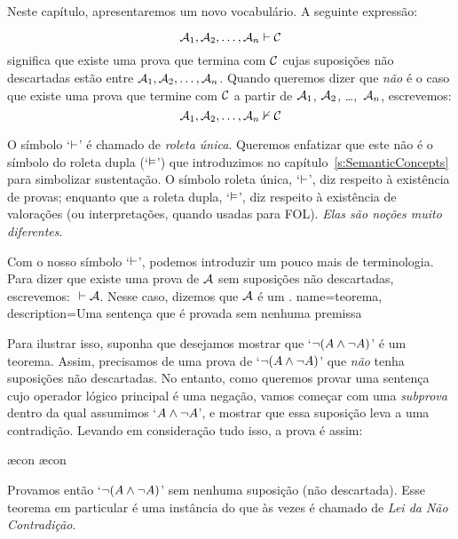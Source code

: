  Neste cap\'itulo, apresentaremos um novo vocabul\'ario. A seguinte express\~ao:
 
$$\mathcal{A}_1, \mathcal{A}_2, \ldots, \mathcal{A}_n \vdash \mathcal{C}$$
significa que existe uma prova que termina com $\mathcal{C}$  cujas suposi\c c\~oes n\~ao descartadas est\~ao entre $\mathcal{A}_1, \mathcal{A}_2, \ldots, \mathcal{A}_n$. Quando queremos dizer que  \emph{n\~ao} \'e o caso que existe uma prova que termine com $\mathcal{C}$ a partir de $\mathcal{A}_1$, $\mathcal{A}_2$, \dots,~$\mathcal{A}_n$, escrevemos:  $$\mathcal{A}_1, \mathcal{A}_2, \ldots, \mathcal{A}_n \nvdash \mathcal{C}$$  

O s\'imbolo `$\vdash$'  \'e chamado de  \emph{roleta \'unica}. Queremos enfatizar que este n\~ao \'e o s\'imbolo do roleta dupla (`$\vDash$') que introduzimos no cap\'itulo~\ref{s:SemanticConcepts}  para simbolizar sustenta\c c\~ao. O s\'imbolo roleta \'unica, `$\vdash$', diz respeito \`a exist\^encia de provas; enquanto que a roleta dupla, `$\vDash$', diz respeito \`a exist\^encia de valora\c c\~oes (ou interpreta\c c\~oes, quando usadas para FOL). \emph{Elas s\~ao no\c c\~oes muito diferentes}.

Com o nosso s\'imbolo  `$\vdash$',  podemos introduzir um pouco mais de terminologia. Para dizer que existe uma prova de $\mathcal{A}$ sem suposi\c c\~oes n\~ao descartadas, escrevemos: ${} \vdash \mathcal{A}$. Nesse caso, dizemos que $\mathcal{A}$ \'e um .
{
name=teorema,
description={Uma senten\c ca que \'e provada sem nenhuma premissa}
}

Para ilustrar isso, suponha que desejamos mostrar que `$\neg (A \wedge \neg A)$' \'e um teorema. Assim, precisamos de uma prova de `$\neg(A \wedge \neg A)$' que \emph{n\~ao} tenha suposi\c c\~oes n\~ao descartadas. No entanto, como queremos provar uma senten\c ca cujo operador l\'ogico principal \'e uma nega\c c\~ao, vamos come\c car com uma \emph{subprova}  dentro da qual assumimos `$A \wedge \neg A$', e mostrar que essa suposi\c c\~ao leva a uma contradi\c c\~ao. Levando em considera\c c\~ao tudo isso, a prova \'e assim:
	\begin{fitchproof}
		\open
			\ae{con}
			\ae{con}
		\close
	\end{fitchproof}
Provamos ent\~ao `$\neg (A \wedge \neg A)$' sem nenhuma suposi\c c\~ao (n\~ao descartada).  Esse teorema em particular \'e uma inst\^ancia do que \`as vezes \'e chamado de \emph{Lei da N\~ao Contradi\c c\~ao}.


